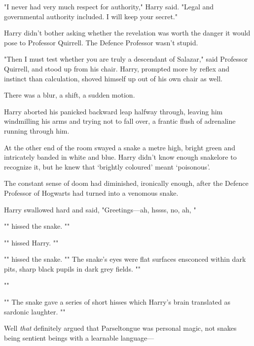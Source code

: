"I never had very much respect for authority," Harry said. "Legal and
governmental authority included. I will keep your secret."

Harry didn't bother asking whether the revelation was worth the danger it would
pose to Professor Quirrell. The Defence Professor wasn't stupid.

"Then I must test whether you are truly a descendant of Salazar," said
Professor Quirrell, and stood up from his chair. Harry, prompted more by reflex
and instinct than calculation, shoved himself up out of his own chair as well.

There was a blur, a shift, a sudden motion.

Harry aborted his panicked backward leap halfway through, leaving him
windmilling his arms and trying not to fall over, a frantic flush of adrenaline
running through him.

At the other end of the room swayed a snake a metre high, bright green and
intricately banded in white and blue. Harry didn't know enough snakelore to
recognize it, but he knew that `brightly coloured' meant `poisonous'.

The constant sense of doom had diminished, ironically enough, after the Defence
Professor of Hogwarts had turned into a venomous snake.

Harry swallowed hard and said, "Greetings—ah, hssss, no, ah,
"

"" hissed the snake. ""

"" hissed Harry. ""

"" hissed the snake. "" The snake's eyes were flat surfaces ensconced within dark pits, sharp
black pupils in dark grey fields. ""

""

"" The snake gave a series of
short hisses which Harry's brain translated as sardonic laughter.
""

Well \emph{that} definitely argued that Parseltongue was personal magic, not
snakes being sentient beings with a learnable language—

